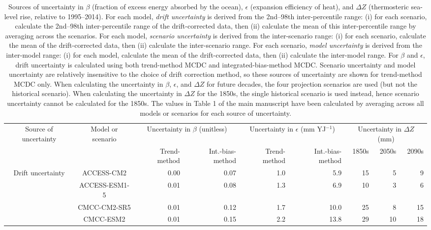 \begin{table*}[t]
\centering
\caption{Sources of uncertainty in $\beta$ (fraction of excess energy absorbed by the ocean), $\epsilon$ (expansion efficiency of heat), and ${\Delta}Z$ (thermosteric sea-level rise, relative to 1995--2014). For each model, \emph{drift uncertainty} is derived from the 2nd--98th inter-percentile range: (i) for each scenario, calculate the 2nd--98th inter-percentile range of the drift-corrected data, then (ii) calculate the mean of this inter-percentile range by averaging across the scenarios. For each model, \emph{scenario uncertainty} is derived from the inter-scenario range: (i) for each scenario, calculate the mean of the drift-corrected data, then (ii) calculate the inter-scenario range. For each scenario, \emph{model uncertainty} is derived from the inter-model range: (i) for each model, calculate the mean of the drift-corrected data, then (ii) calculate the inter-model range. For $\beta$ and $\epsilon$, drift uncertainty is calculated using both trend-method MCDC and integrated-bias-method MCDC. Scenario uncertainty and model uncertainty are relatively insensitive to the choice of drift correction method, so these sources of uncertainty are shown for trend-method MCDC only. When calculating the uncertainty in $\beta$, $\epsilon$, and ${\Delta}Z$ for future decades, the four projection scenarios are used (but not the historical scenario). When calculating the uncertainty in ${\Delta}Z$ for the 1850s, the single historical scenario is used instead, hence scenario uncertainty cannot be calculated for the 1850s. The values in Table 1 of the main manuscript have been calculated by averaging across all models or scenarios for each source of uncertainty.}
\begin{tabular}{c|c|rr|rr|rrr}
\toprule
Source of uncertainty & Model or scenario & \multicolumn{2}{c|}{Uncertainty in $\beta$ (unitless)} & \multicolumn{2}{c|}{Uncertainty in $\epsilon$ (mm YJ$^{-1}$)} & \multicolumn{3}{c}{Uncertainty in ${\Delta}Z$ (mm)} \\
 &  & Trend-method & Int.-bias-method & Trend-method & Int.-bias-method & 1850s & 2050s & 2090s \\
\midrule
\multirow[c]{16}{*}{Drift uncertainty} & ACCESS-CM2 & 0.00 & 0.07 & 1.0 & 5.9 & 15 & 5 & 9 \\
 & ACCESS-ESM1-5 & 0.01 & 0.08 & 1.3 & 6.9 & 10 & 3 & 6 \\
 & CMCC-CM2-SR5 & 0.01 & 0.12 & 1.7 & 10.0 & 25 & 8 & 15 \\
 & CMCC-ESM2 & 0.01 & 0.15 & 2.2 & 13.8 & 29 & 10 & 18 \\

\end{tabular}
\end{table*}
